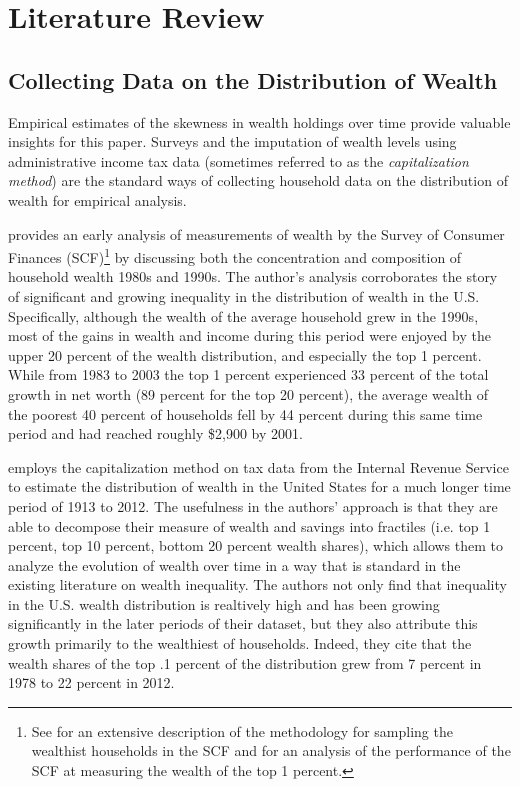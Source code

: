 \onlyinsubfile{\setcounter{section}{1}}
\section{Literature Review}
\notinsubfile{\label{sec:Literature Review}}

\subsection{Collecting Data on the Distribution of Wealth}

\par Empirical estimates of the skewness in wealth holdings over time provide valuable insights for this paper. Surveys and the imputation of wealth levels using administrative income tax data (sometimes referred to as the \textit{capitalization method}) are the standard ways of collecting household data on the distribution of wealth for empirical analysis.

\par \cite{wolff2004} provides an early analysis of measurements of wealth by the Survey of Consumer Finances (SCF)\footnote{ See \cite{kennickell2017a} for an extensive description of the methodology for sampling the wealthist households in the SCF and \cite{kennickell2017b} for an analysis of the performance of the SCF at measuring the wealth of the top 1 percent.} by discussing both the concentration and composition of household wealth 1980s and 1990s. The author's analysis corroborates the story of significant and growing inequality in the distribution of wealth in the U.S. Specifically, although the wealth of the average household grew in the 1990s, most of the gains in wealth and income during this period were enjoyed by the upper 20 percent of the wealth distribution, and especially the top 1 percent. While from 1983 to 2003 the top 1 percent experienced 33 percent of the total growth in net worth (89 percent for the top 20 percent), the average wealth of the poorest 40 percent of households fell by 44 percent during this same time period and had reached roughly \$2,900 by 2001.

\cite{sz16} employs the capitalization method on tax data from the Internal Revenue Service to estimate the distribution of wealth in the United States for a much longer time period of 1913 to 2012. The usefulness in the authors' approach is that they are able to decompose their measure of wealth and savings into fractiles (i.e. top 1 percent, top 10 percent, bottom 20 percent wealth shares), which allows them to analyze the evolution of wealth over time in a way that is standard in the existing literature on wealth inequality. The authors not only find that inequality in the U.S. wealth distribution is realtively high and has been growing significantly in the later periods of their dataset, but they also attribute this growth primarily to the wealthiest of households. Indeed, they cite that the wealth shares of the top .1 percent of the distribution grew from 7 percent in 1978 to 22 percent in 2012. 

